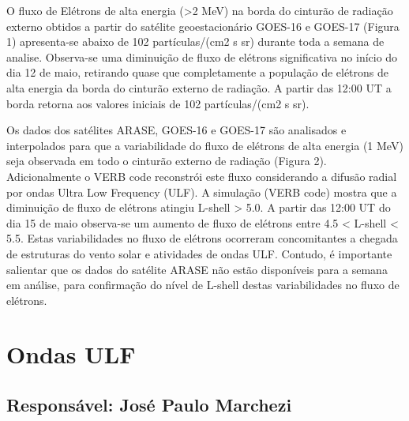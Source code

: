 \documentclass[a4paper, 10pt]{article}
\begin{document}
                     O fluxo de Elétrons de alta energia (>2 MeV) na borda do cinturão de radiação externo obtidos a partir do satélite geoestacionário GOES-16 e GOES-17 (Figura 1) apresenta-se abaixo de 102 partículas/(cm2 s sr) durante toda a semana de analise. Observa-se uma diminuição de fluxo de elétrons significativa no início do dia 12 de maio, retirando quase que completamente a população de elétrons de alta energia da borda do cinturão externo de radiação. A partir das 12:00 UT a borda retorna aos valores iniciais de 102 partículas/(cm2 s sr). 

Os dados dos satélites ARASE, GOES-16 e GOES-17 são analisados e interpolados para que a variabilidade do fluxo de elétrons de alta energia (1 MeV) seja observada em todo o cinturão externo de radiação (Figura 2). Adicionalmente o VERB code reconstrói este fluxo considerando a difusão radial por ondas Ultra Low Frequency (ULF). A simulação (VERB code) mostra que a diminuição de fluxo de elétrons atingiu L-shell > 5.0. A partir das 12:00 UT do dia 15 de maio observa-se um aumento de fluxo de elétrons entre 4.5 < L-shell < 5.5. Estas variabilidades no fluxo de elétrons ocorreram concomitantes a chegada de estruturas do vento solar e atividades de ondas ULF. Contudo, é importante salientar que os dados do satélite ARASE não estão disponíveis para a semana em análise, para confirmação do nível de L-shell destas variabilidades no fluxo de elétrons.



\section{Ondas ULF} 
 \subsection{Responsável: José Paulo Marchezi} 
 
\end{document}
